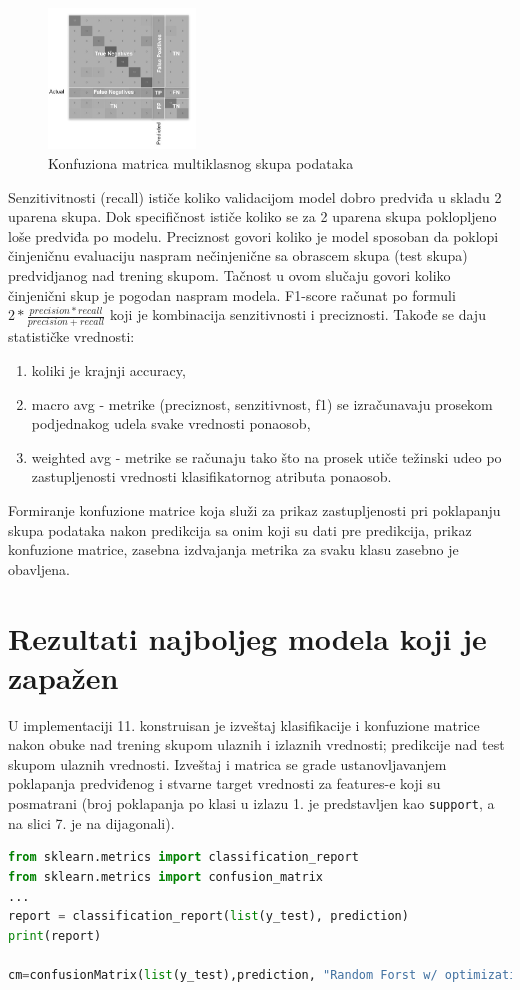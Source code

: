 \documentclass[fontsize=12bp, paper=a4]{scrarticle}
\begin{document}
\begin{figure}[h]
    \centering
    \includegraphics[width=0.35\textwidth]{3.png}
    \caption{\centering Konfuziona matrica multiklasnog skupa podataka}
\end{figure}
Senzitivitnosti (recall) ističe koliko validacijom model dobro predviđa u skladu 2 uparena skupa. Dok specifičnost ističe koliko se za 2 uparena skupa poklopljeno loše predviđa po modelu. Preciznost govori koliko je model sposoban da poklopi činjeničnu evaluaciju naspram nečinjenične sa obrascem skupa (test skupa) predvidjanog nad trening skupom. Tačnost u ovom slučaju govori koliko činjenični skup je pogodan naspram modela. F1-score računat po formuli $2*\frac{precision*recall}{precision+recall}$ koji je kombinacija senzitivnosti i preciznosti. Takođe se daju statističke vrednosti:
\begin{enumerate}
    \item koliki je krajnji accuracy,
    \item macro avg - metrike (preciznost, senzitivnost, f1) se izračunavaju prosekom podjednakog udela svake vrednosti ponaosob,\cite{metrics1}\cite{metrics2}
    \item weighted avg - metrike se računaju tako što na prosek utiče težinski udeo po zastupljenosti vrednosti klasifikatornog atributa ponaosob.
\end{enumerate}
Formiranje konfuzione matrice koja služi za prikaz zastupljenosti pri poklapanju skupa podataka nakon predikcija sa onim koji su dati pre predikcija, prikaz konfuzione matrice, zasebna izdvajanja metrika  za svaku klasu zasebno je obavljena.

\newpage

\section{Rezultati najboljeg modela koji je zapažen}
U implementaciji 11. konstruisan je izveštaj klasifikacije i konfuzione matrice nakon obuke nad trening skupom ulaznih i izlaznih vrednosti; predikcije nad test skupom ulaznih vrednosti. Izveštaj i matrica se grade ustanovljavanjem poklapanja predviđenog i stvarne target vrednosti za features-e koji su posmatrani (broj poklapanja po klasi u izlazu 1. je predstavljen kao \verb|support|, a na slici 7. je na dijagonali).
\begin{lstlisting}[language=Python, caption={\centering Implementacija generisanja izveštaja i matrice klasifikacije}]
from sklearn.metrics import classification_report
from sklearn.metrics import confusion_matrix
...
report = classification_report(list(y_test), prediction)
print(report)
    
cm=confusionMatrix(list(y_test),prediction, "Random Forst w/ optimization")
\end{lstlisting}
\end{document}
